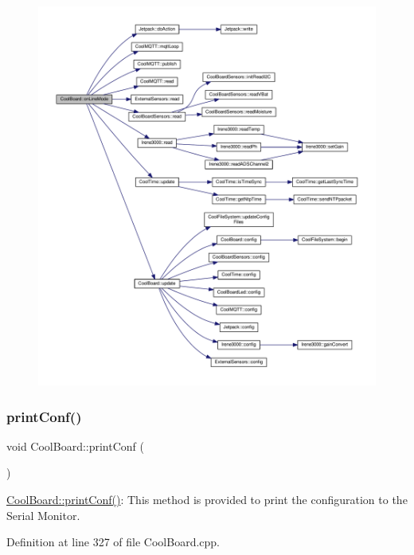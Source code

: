 \nopagebreak
\begin{figure}[H]
\begin{center}
\leavevmode
\includegraphics[width=350pt]{classCoolBoard_aa0bbc4bc605e35618d18e68795c61363_cgraph}
\end{center}
\end{figure}
\mbox{\label{classCoolBoard_a486507b8f0981d3cc671ed31c2145755}} 
\subsubsection{\texorpdfstring{print\+Conf()}{printConf()}}
{\footnotesize\ttfamily void Cool\+Board\+::print\+Conf (\begin{DoxyParamCaption}{ }\end{DoxyParamCaption})}

\hyperlink{classCoolBoard_a486507b8f0981d3cc671ed31c2145755}{Cool\+Board\+::print\+Conf()}\+: This method is provided to print the configuration to the Serial Monitor. 

Definition at line 327 of file Cool\+Board.\+cpp.



